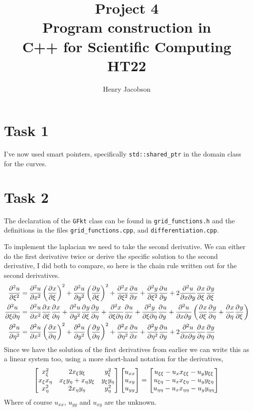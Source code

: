 \documentclass{setup}
\title{Project 4\\Program construction in \\C++ for Scientific Computing\\HT22}
\author{Henry Jacobson}
\begin{document}
\maketitle
\section{Task 1}
I've now used smart pointers, specifically \texttt{std::shared\_ptr} in the domain class for the curves.
\section{Task 2}
The declaration of the \texttt{GFkt} class can be found in \texttt{grid\_functions.h} and the definitions in the files
\texttt{grid\_functions.cpp}, and \texttt{differentiation.cpp}.

To implement the laplacian we need to take the second derivative. We can either do the first derivative twice or derive the specific solution to the second derivative, I did both to compare, so here is the chain rule written out for the second derivatives.
\begin{align}
    \pdv[2]{u}{\xi} &= \pdv[2]{u}{x}\pth{\pdv{x}{\xi}}^2 + \pdv[2]{u}{y}\pth{\pdv{y}{\xi}}^2 + \pdv[2]{x}{\xi}\pdv{u}{x} + \pdv[2]{y}{\xi}\pdv{u}{y} + 2\pddv{u}{x}{y}\pdv{x}{\xi}\pdv{y}{\xi}
    \\
    \pddv{u}{\xi}{\eta} &= \pdv[2]{u}{x}\pdv{x}{\xi}\pdv{x}{\eta} + \pdv[2]{u}{y}\pdv{y}{\xi}\pdv{y}{\eta} + \pddv{x}{\xi}{\eta}\pdv{u}{x} + \pddv{y}{\xi}{\eta}\pdv{u}{y} + \pddv{u}{x}{y}\pth{\pdv{x}{\xi}\pdv{y}{\eta} + \pdv{x}{\eta}\pdv{y}{\xi}}
    \\
    \pdv[2]{u}{\eta} &= \pdv[2]{u}{x}\pth{\pdv{x}{\eta}}^2 + \pdv[2]{u}{y}\pth{\pdv{y}{\eta}}^2 + \pdv[2]{x}{\eta}\pdv{u}{x} + \pdv[2]{y}{\eta}\pdv{u}{y} + 2\pddv{u}{x}{y}\pdv{x}{\eta}\pdv{y}{\eta}
\end{align}
Since we have the solution of the first derivatives from earlier we can write this as a linear system too, using a more short-hand notation for the derivatives,
\begin{align}
    \mtr{
        x_\xi^2 & 2x_\xi y_\xi & y_\xi^2
        \\
        x_\xi x_\eta & x_\xi y_\eta + x_\eta y_\xi & y_\xi y_\eta
        \\
        x_\eta^2 & 2x_\eta y_\eta & y_\eta^2
    }
    \mtr{
        u_{xx}
        \\
        u_{xy}
        \\
        u_{yy}
    }
    = 
    \mtr{
        u_{\xi\xi} - u_xx_{\xi\xi}- u_yy_{\xi\xi} 
        \\
        u_{\xi\eta} - u_xx_{\xi\eta}- u_yy_{\xi\eta} 
        \\
        u_{\eta\eta}  - u_xx_{\eta\eta}- u_yy_{\eta\eta}
    }
\end{align}
Where of course $u_{xx}$, $u_{yy}$ and $u_{xy}$ are the unknown.
\end{document}
